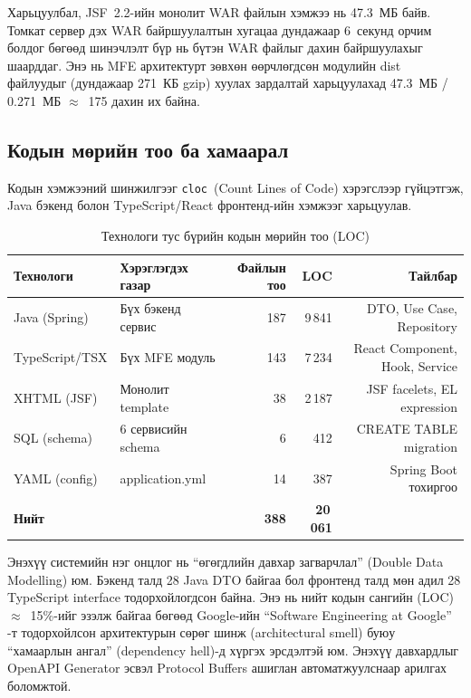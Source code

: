 Харьцуулбал, JSF~2.2-ийн монолит WAR файлын хэмжээ нь 47.3~МБ байв.
Томкат сервер дэх WAR байршуулалтын хугацаа дундажаар 6~секунд орчим
болдог бөгөөд шинэчлэлт бүр нь бүтэн WAR файлыг дахин байршуулахыг
шаарддаг. Энэ нь MFE архитектурт зөвхөн өөрчлөгдсөн модулийн dist
файлуудыг (дундажаар 271~КБ gzip) хуулах зардалтай харьцуулахад
47.3~МБ / 0.271~МБ $\approx$~175 дахин их байна.

\subsection{Кодын мөрийн тоо ба хамаарал}

Кодын хэмжээний шинжилгээг \texttt{cloc}~(Count Lines of Code) хэрэгслээр
гүйцэтгэж, Java бэкенд болон TypeScript/React фронтенд-ийн хэмжээг харьцуулав.

\begin{table}[H]
    \centering
    \caption{Технологи тус бүрийн кодын мөрийн тоо (LOC)}
    \label{tab:loc_comparison}
    \renewcommand{\arraystretch}{0.7}
    \begin{tabular}{llrrr}
        \toprule
        \textbf{Технологи} & \textbf{Хэрэглэгдэх газар} & \textbf{Файлын тоо} & \textbf{LOC} & \textbf{Тайлбар} \\
        \midrule
        Java (Spring)       & Бүх бэкенд сервис  & 187 & 9\,841  & DTO, Use Case, Repository \\
        TypeScript/TSX      & Бүх MFE модуль      & 143 & 7\,234  & React Component, Hook, Service \\
        XHTML (JSF)         & Монолит template    & 38  & 2\,187  & JSF facelets, EL expression \\
        SQL (schema)        & 6 сервисийн schema  & 6   & 412     & CREATE TABLE migration \\
        YAML (config)       & application.yml     & 14  & 387     & Spring Boot тохиргоо \\
        \midrule
        \textbf{Нийт}       &                     & \textbf{388} & \textbf{20\,061} & \\
        \bottomrule
    \end{tabular}
\end{table}

Энэхүү системийн нэг онцлог нь ``өгөгдлийн давхар загварчлал'' (Double Data Modelling) юм. Бэкенд талд 28 Java DTO байгаа бол фронтенд талд мөн адил 28 TypeScript interface тодорхойлогдсон байна. Энэ нь нийт кодын сангийн (LOC) $\approx$~15\%-ийг эзэлж байгаа бөгөөд Google-ийн ``Software Engineering at Google'' \cite{winters2020software}-т тодорхойлсон архитектурын сөрөг шинж (architectural smell) буюу ``хамаарлын ангал'' (dependency hell)-д хүргэх эрсдэлтэй юм. Энэхүү давхардлыг OpenAPI Generator эсвэл Protocol Buffers ашиглан автоматжуулснаар арилгах боломжтой.

